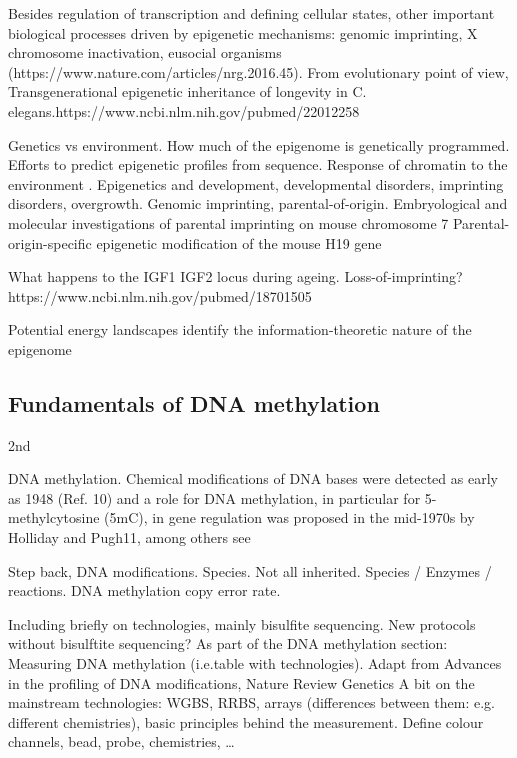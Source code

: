 Besides regulation of transcription and defining cellular states, other important biological processes driven by epigenetic mechanisms: genomic imprinting, X chromosome inactivation, eusocial organisms (https://www.nature.com/articles/nrg.2016.45). From evolutionary point of view, Transgenerational epigenetic inheritance of longevity in C. elegans.https://www.ncbi.nlm.nih.gov/pubmed/22012258




Genetics vs environment. How much of the epigenome is genetically programmed. Efforts to predict epigenetic profiles from sequence. Response of chromatin to the environment \cite{Allis2016}. 
Epigenetics and development, developmental disorders, imprinting disorders, overgrowth.
Genomic imprinting, parental-of-origin.
Embryological and molecular investigations of parental imprinting on mouse chromosome 7
Parental-origin-specific epigenetic modification of the mouse H19 gene

What happens to the IGF1 IGF2 locus during ageing. Loss-of-imprinting?
https://www.ncbi.nlm.nih.gov/pubmed/18701505

Potential energy landscapes identify the information-theoretic nature of the epigenome


\subsection{Fundamentals of DNA methylation} \label{s:1.2.2}

2nd

DNA methylation. Chemical modifications of DNA bases were detected as early as 1948 (Ref. 10) and a role for DNA methylation, in particular for 5-methylcytosine (5mC), in gene regulation was proposed in the mid-1970s by Holliday and Pugh11, among others see \cite{Allis2016}

Step back, DNA modifications. Species. Not all inherited.
Species / Enzymes / reactions.
DNA methylation copy error rate. 

Including briefly on technologies, mainly bisulfite sequencing.
New protocols without bisulftite sequencing?
As part of the DNA methylation section: Measuring DNA methylation (i.e.table with technologies). Adapt from Advances in the profiling of DNA modifications, Nature Review Genetics
A bit on the mainstream technologies: WGBS, RRBS, arrays (differences between them: e.g. different chemistries), basic principles behind the measurement. Define colour channels, bead, probe, chemistries, …


